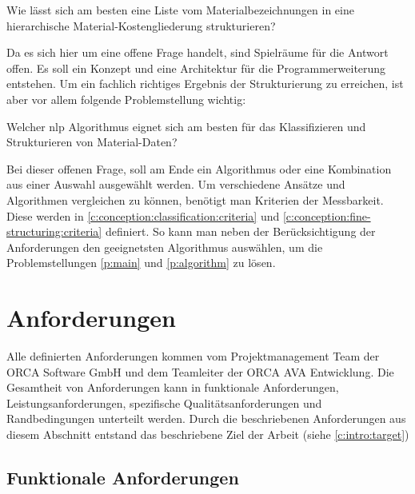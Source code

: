 \begin{problem}
	\label{p:main}
	Wie lässt sich am besten eine Liste vom Materialbezeichnungen in eine hierarchische Material-Kostengliederung strukturieren?
\end{problem}

Da es sich hier um eine offene Frage handelt, sind Spielräume für die Antwort offen. Es soll ein Konzept und eine Architektur für die Programmerweiterung entstehen. Um ein fachlich richtiges Ergebnis der Strukturierung zu erreichen, ist aber vor allem folgende Problemstellung wichtig:

\begin{problem}
	\label{p:algorithm}
	Welcher \ac{nlp} Algorithmus eignet sich am besten für das Klassifizieren und Strukturieren von Material-Daten? 
\end{problem}

Bei dieser offenen Frage, soll am Ende ein Algorithmus oder eine Kombination aus einer Auswahl ausgewählt werden. Um verschiedene Ansätze und Algorithmen vergleichen zu können, benötigt man Kriterien der Messbarkeit. Diese werden in \autoref{c:conception:classification:criteria} und \autoref{c:conception:fine-structuring:criteria} definiert. So kann man neben der Berücksichtigung der Anforderungen den geeignetsten Algorithmus auswählen, um die Problemstellungen \ref{p:main} und \ref{p:algorithm} zu lösen.


\section{Anforderungen}
\label{c:requirements:requirements}
Alle definierten Anforderungen kommen vom Projektmanagement Team der ORCA Software GmbH und dem Teamleiter der ORCA AVA Entwicklung. Die Gesamtheit von Anforderungen kann in funktionale Anforderungen, Leistungsanforderungen, spezifische Qualitätsanforderungen und Randbedingungen unterteilt werden.\citep[vgl.][]{glinz_2007} Durch die beschriebenen Anforderungen aus diesem Abschnitt entstand das beschriebene Ziel der Arbeit (siehe \autoref{c:intro:target})

\subsection{Funktionale Anforderungen}
\label{c:requirements:requirements:functional}

